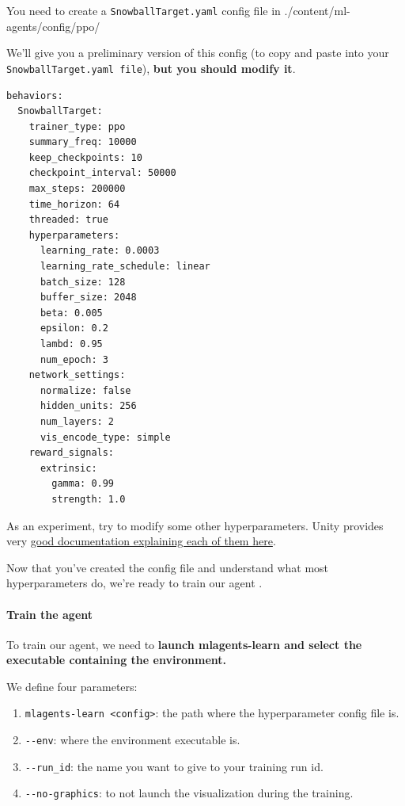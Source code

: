 \documentclass[11pt,a4paper]{article}
\begin{document}
You need to create a \texttt{SnowballTarget.yaml} config file in ./content/ml-agents/config/ppo/

We'll give you a preliminary version of this config (to copy and paste into your \texttt{SnowballTarget.yaml\ file}), \textbf{but you should modify it}.

\begin{lstlisting}
behaviors:
  SnowballTarget:
    trainer_type: ppo
    summary_freq: 10000
    keep_checkpoints: 10
    checkpoint_interval: 50000
    max_steps: 200000
    time_horizon: 64
    threaded: true
    hyperparameters:
      learning_rate: 0.0003
      learning_rate_schedule: linear
      batch_size: 128
      buffer_size: 2048
      beta: 0.005
      epsilon: 0.2
      lambd: 0.95
      num_epoch: 3
    network_settings:
      normalize: false
      hidden_units: 256
      num_layers: 2
      vis_encode_type: simple
    reward_signals:
      extrinsic:
        gamma: 0.99
        strength: 1.0
\end{lstlisting}



As an experiment, try to modify some other hyperparameters. Unity provides very \href{https://github.com/Unity-Technologies/ml-agents/blob/main/docs/Training-Configuration-File.md}{good documentation explaining each of them here}.

Now that you've created the config file and understand what most hyperparameters do, we're ready to train our agent .

\paragraph{Train the agent}\label{train-the-agent}

To train our agent, we need to \textbf{launch mlagents-learn and select the executable containing the environment.}

We define four parameters:

\begin{enumerate}
\def\labelenumi{\arabic{enumi}.}
\tightlist
\item
  \texttt{mlagents-learn\ \textless{}config\textgreater{}}: the path where the hyperparameter config file is.
\item
  \texttt{-\/-env}: where the environment executable is.
\item
  \texttt{-\/-run\_id}: the name you want to give to your training run id.
\item
  \texttt{-\/-no-graphics}: to not launch the visualization during the training.
\end{enumerate}
\end{document}
